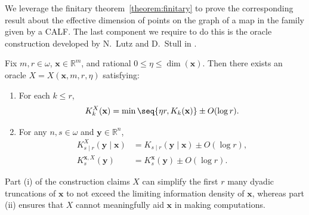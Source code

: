 \label{section:Infinitary_Theorem}

We leverage the finitary theorem~\ref{theorem:finitary} to prove the corresponding result about the effective dimension of points on the graph of a map in the family given by a CALF. The last component we require to do this is the oracle construction developed by N.~Lutz and D.~Stull in \cite{LS16}. 

\begin{lemma}
    \label{lemma:oracle_construction}
    Fix $m, r \in \omega$, $\mathbf{x} \in \mathbb{R}^m$, and rational $0 \leq \eta \leq \dim(\mathbf{x})$. Then there exists an oracle $X = X(\mathbf{x}, m, r, \eta)$ satisfying:
    \begin{enumerate}[label = (\roman*)]
        \item For each $k \leq r$,
        \begin{align*}
            K^X_k(\mathbf{x}) = \min \seq{\eta r, K_k(\mathbf{x})} \pm O(\log r).
        \end{align*}
        \item For any $n, s \in \omega$ and $\mathbf{y} \in \mathbb{R}^n$,
        \begin{align*}
            K^X_{s \mid r}(\mathbf{y} \mid \mathbf{x}) &= K_{s \mid r}(\mathbf{y} \mid \mathbf{x}) \pm O(\log r),\\
            K^{\mathbf{x}, X}_s(\mathbf{y}) &= K^{\mathbf{x}}_s(\mathbf{y}) \pm O(\log r).
        \end{align*}
    \end{enumerate}
\end{lemma}
Part (i) of the construction claims $X$ can simplify the first $r$ many dyadic truncations of $\mathbf{x}$ to not exceed the limiting information density of $\mathbf{x}$, whereas part (ii) ensures that $X$ cannot meaningfully aid $\mathbf{x}$ in making computations.

